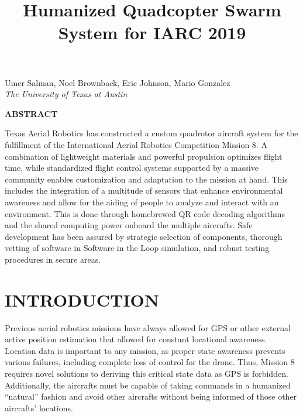 \documentclass[12pt,letterpaper]{article}
\title{Humanized Quadcopter Swarm System for IARC 2019}
\newenvironment{nscenter}
 {\parskip=0pt\par\nopagebreak\centering}
 {\par\noindent\ignorespacesafterend}
\newcommand{\affiliatedauthor}[2]{
\begin{nscenter}
	#1 \\ \textit{#2}
\end{nscenter}
}
\renewcommand{\abstractname}{ABSTRACT}
\renewenvironment{abstract}
 {\vspace{-0.5ex}
	\small
	\begin{center}
		\bfseries \abstractname\vspace{-4ex}\vspace{0pt}
	\end{center}
	\list{}{
		\setlength{\leftmargin}{0.5in}
		\setlength{\rightmargin}{\leftmargin}
	}
	\item\relax}
 {\endlist}
\begin{document}
\begin{center}
	\textbf{\LARGE{\thetitle}}
\end{center}

\affiliatedauthor{Umer Salman, Noel Brownback, Eric Johnson, Mario Gonzalez}{The University of Texas at Austin}


\begin{abstract}
	Texas Aerial Robotics has constructed a custom quadrotor aircraft system for the fulfillment of the International Aerial Robotics Competition Mission 8. A combination of lightweight materials and powerful propulsion optimizes flight time, while standardized flight control systems supported by a massive community enables customization and adaptation to the mission at hand. This includes the integration of a multitude of sensors that enhance environmental awareness and allow for the aiding of people to analyze and interact with an environment. This is done through homebrewed QR code decoding algorithms and the shared computing power onboard the multiple aircrafts. Safe development has been assured by strategic selection of components, thorough vetting of software in Software in the Loop simulation, and robust testing procedures in secure areas.
\end{abstract}


\section*{INTRODUCTION}
	Previous aerial robotics missions have always allowed for GPS or other external active position estimation that allowed for constant locational awareness. Location data is important to any mission, as proper state awareness prevents various failures, including complete loss of control for the drone. Thus, Mission 8 requires novel solutions to deriving this critical state data as GPS is forbidden. Additionally, the aircrafts must be capable of taking commands in a humanized ``natural'' fashion and avoid other aircrafts without being informed of those other aircrafts' locations.
\end{document}

